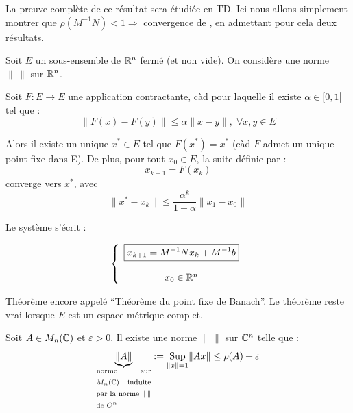 La preuve complète de ce résultat sera étudiée en TD. Ici nous allons simplement montrer que $\rho(M^{-1}N)<1 \Rightarrow $ convergence de , en admettant pour cela deux résultats.

\vspace{1cm}

\begin{ftheo}
    Soit $E$ un sous-ensemble de $\mathbb{R}^n$ fermé (et non vide). On considère une norme $\| \, \|$ sur $\mathbb{R}^n$.

    Soit $F : E \rightarrow E$ une application contractante, càd pour laquelle il existe $\alpha \in [0,1[$ tel que :
\[
    \| F(x) - F(y) \| \leq \alpha \| x-y \| \mbox{,} \: \: \forall x,y \in E
\]

    Alors il existe un unique $x^* \in E$ tel que $F(x^*)=x^*$ (càd $F$ admet un unique point fixe dans E). De plus, pour tout $x_0 \in E$, la suite définie par :
\[
    x_{k+1} = F(x_k)
\]
converge vers $x^*$, avec
\begin{equation}
    \| x^* - x_k \| \leq \frac{\alpha^k}{1 - \alpha} \| x_1 - x_0 \|
    \label{eq:3}
\end{equation}

Le système  s'écrit :

\begin{equation}
\left\lbrace
\begin{array}{c}
    \boxed{x_{k+1} = M^{-1}N x_k + M^{-1} b}\\
    \\
    x_0 \in \mathbb{R}^n
    \label{eq:5}
\end{array}\right.
\end{equation}

\end{ftheo}

\begin{remark}
   Théorème encore appelé ``Théorème du point fixe de Banach''. Le théorème reste vrai lorsque $E$ est un espace métrique complet.
\end{remark}

\begin{ftheo}
    Soit $A \in M_n(\mathbb{C})$ et $\varepsilon > 0$. Il existe une norme $\| \, \|$ sur $\mathbb{C}^n$ telle que :
\[
    \underbrace{\|A\|}_
    \text{\parbox[]{2cm}{norme sur $M_n(\C)$ induite par la norme $\| \, \|$ de $C^n$}}
        :=  \underset{\|x\|=1}{\Sup} \|Ax\| \leq \rho(A) + \varepsilon
\]
  
\end{ftheo}

